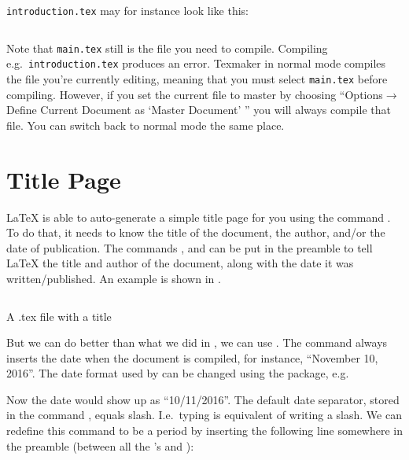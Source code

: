 {\verb|introduction.tex| may for instance look like this:
	\inputminted[frame=lines,linenos]{latex}{latex/introduction.tex}
Note that \verb|main.tex| still is the file you need to compile. Compiling e.g.\ \verb|introduction.tex| produces an error. Texmaker in normal mode compiles the file you're currently editing, meaning that you must select \verb|main.tex| before compiling. However, if you set the current file to master by choosing ``Options$\rightarrow$Define Current Document as `Master Document' '' you will always compile that file. You can switch back to normal mode the same place.

\section{Title Page}\label{sec:latex:title}
\index{\latexin{\maketitle}}
\index{\latexin{\title}}
\index{\latexin{\author}}
\index{\latexin{\date}}
\LaTeX{} is able to auto-generate a simple title page for you using the command \latexin{\maketitle}. To do that, it needs to know the title of the document, the author, and/or the date of publication. The commands \latexin{\title}, \latexin{\author} and \latexin{\date} can be put in the preamble to tell \LaTeX{} the title and author of the document, along with the date it was written/published. An example is shown in .

\begin{listing}
	\inputminted[frame=lines,linenos]{latex}{latex/title.tex}
	\caption{A .tex file with a title}
	\label{lst:latex:title}
\end{listing}

\index{\latexin{\today}}
But we can do better than what we did in , we can use \latexin{\date{\today}}. The command \latexin{\today} always inserts the date when the document is compiled, for instance, ``November 10, 2016''. The date format used by \latexin{\today} can be changed using the  package, e.g.\

\latexone{\usepackage[ddmmyyyy]{datetime}}
\noindent Now the date would show up as ``10/11/2016''. The default date separator, stored in the command \latexin{\dateseparator}, equals slash. I.e.\ typing \latexin{\dateseparator} is equivalent of writing a slash. We can redefine this command to be a period by inserting the following line somewhere in the preamble (between all the \latexin{\usepackage}'s and \latexin{}):

}
